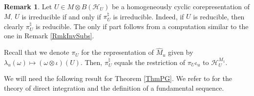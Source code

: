 \documentclass[11pt]{article}
\numberwithin{equation}{section}
\theoremstyle{definition}
\newtheorem{rmk}[thm]{Remark}
\newcommand{\cHil}{\mathcal{H}}
\begin{document}
\begin{rmk}\label{RmkIr}
Let $U \in M \otimes B(\cHil_U)$ be a homogeneously cyclic corepresentation of $M$. $U$ is irreducible if and only if $\pi_U^\natural$ is irreducible. Indeed, if $U$ is reducible, then clearly $\pi_U^\natural$ is reducible. The only if part follows from a computation similar to the one in Remark \ref{RmkInvSubs}.
\end{rmk}

 Recall that we denote $\pi_U$ for the representation of $\hat{M}_u$ given by $\lambda_u(\omega) \mapsto (\omega \otimes \iota)(U)$. Then, $\pi_U^\natural$ equals the restriction of $\pi_U \iota_u$ to $\cHil_U^{M_1}$.

We will need the following result for Theorem \ref{ThmPG}. We refer to \cite{DixVNA} for the theory of direct integration and the def\/inition of a fundamental sequence.
\end{document}
